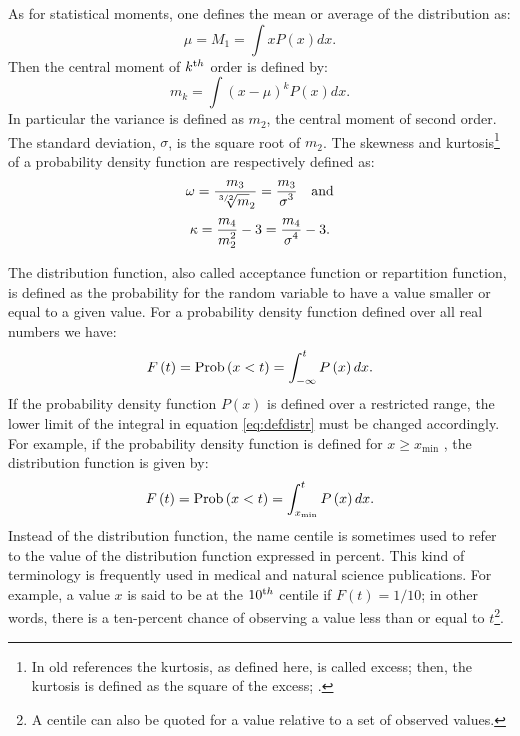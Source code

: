As for statistical moments, one defines the mean or average of the
distribution as:
\begin{equation}
  \mu=M_1=\int x P\left(x\right) dx.
\end{equation}
Then the central moment of $k^{\mathop{\textrm th}}$ order is defined
by:
\begin{equation}
  m_k=\int \left(x-\mu\right)^k P\left(x\right) dx.
\end{equation}
In particular the variance is defined as $m_2$, the central moment
of second order. The standard deviation, $\sigma$, is the square
root of $m_2$. The skewness and kurtosis\footnote{In old
references the kurtosis, as defined here, is called excess; then,
the kurtosis is defined as the square of the excess;
\cite{AbrSteg} \eg.} of a probability density function are
respectively defined as:
\begin{equation}
  \omega={\displaystyle m_3 \over\displaystyle {\root 3/2 \of m_2}}
  ={\displaystyle m_3 \over\displaystyle \sigma^3}\mbox{\quad and}
\end{equation}
\begin{equation}
  \kappa={\displaystyle m_4 \over\displaystyle m_2^2}-3
  ={\displaystyle m_4 \over\displaystyle \sigma^4}-3.
\end{equation}

The distribution function, also called acceptance function or
repartition function, is defined as the probability for the random
variable to have a value smaller or equal to a given value. For a
probability density function defined over all real numbers we
have:
\begin{equation}
\label{eq:defdistr}
  F\left(t\right)=\mathop{\textrm{Prob}}\left(x<t\right)=\int_{-\infty}^t P\left(x\right)
  dx.
\end{equation}
If the probability density function $P\left(x\right)$ is defined
over a restricted range, the lower limit of the integral in
equation \ref{eq:defdistr} must be changed accordingly. For
example, if the probability density function is defined for $x\geq
x_{\min}$ , the distribution function is given by:
\begin{equation}
\label{eq:defdistrmin}
  F\left(t\right)=\mathop{\textrm{Prob}}\left(x<t\right)=\int_{x_{\min}}^t P\left(x\right)
  dx.
\end{equation}
Instead of the distribution function,  the name centile is
sometimes used to refer to the value of the distribution function
expressed in percent. This kind of terminology is frequently used
in medical and natural science publications. For example, a value
$x$ is said to be at the $10^{\mathop{\textrm th}}$ centile if
$F\left(t\right)=1/10$; in other words, there is a ten-percent
chance of observing a value less than or equal to $t$\footnote{A
centile can also be quoted for a value relative to a set of
observed values.}.

